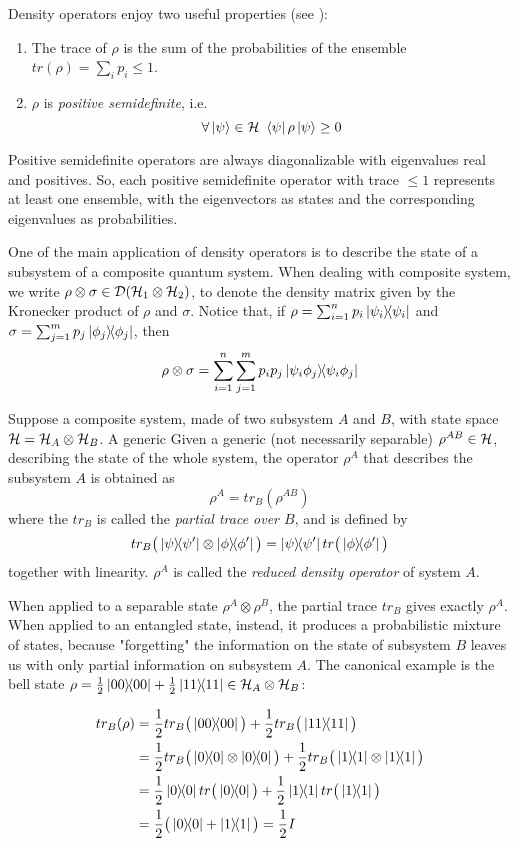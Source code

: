 Density operators enjoy two useful properties (see \cite{nielsenQuantumComputationQuantum2001}): \begin{enumerate}
\item The trace of $\rho$ is the sum of the probabilities of the ensemble $tr(\rho) = \sum_i p_i \leq 1$.
\item $\rho$ is \textit{positive semidefinite}, i.e. 
\[\forall \ket{\psi} \in \mathcal{H} \ \bra{\psi}\rho\ket{\psi} \geq 0\]
\end{enumerate}

Positive semidefinite operators are always diagonalizable with eigenvalues real and positives. So, each positive semidefinite operator with trace $\leq 1$ represents at least one ensemble, with the eigenvectors as states and the corresponding eigenvalues as probabilities.

One of the main application of density operators is to describe the state of a subsystem of a composite quantum system. When dealing with composite system, we write $\rho \otimes \sigma \in \mathcal{D}(\mathcal{H}_1 \otimes \mathcal{H}_2)$, to denote the density matrix given by the Kronecker product of $\rho$ and $\sigma$. Notice that, if $\rho = \sum_{i=1}^n p_i\ket{\psi_i}\!\!\bra{\psi_i}$ and $\sigma = \sum_{j=1}^m p_j\ket{\phi_j}\!\!\bra{\phi_j}$, then 
\[\rho \otimes \sigma = \sum_{i=1}^n\sum_{j=1}^m p_ip_j \ket{\psi_i\phi_j}\!\!\bra{\psi_i\phi_j}\]

Suppose a composite system, made of two subsystem $A$ and $B$, with state space  $\mathcal{H} = \mathcal{H}_A \otimes \mathcal{H}_B$. A generic  Given a generic (not necessarily separable) $\rho^{AB} \in \mathcal{H}$, describing the state of the whole system, the operator $\rho^A$ that describes the subsystem $A$ is obtained as 
\[
	\rho^A = tr_B(\rho^{AB})
\]
where the $tr_B$ is called the \textit{partial trace over $B$}, and is defined by 
\[
 tr_B\big(\ketbra{\psi}{\psi'} \otimes \ketbra{\phi}{\phi'}\big) = \ketbra{\psi}{\psi'}tr\big(\ketbra{\phi}{\phi'}\big)
\]
together with linearity. $\rho^A$ is called the \textit{reduced density operator} of system $A$.

When applied to a separable state $\rho^A \otimes \rho^B$, the partial trace $tr_B$ gives exactly $\rho^A$. When applied to an entangled state, instead, it produces a probabilistic mixture of states, because "forgetting" the information on the state of subsystem $B$ leaves us with only partial information on subsystem $A$. The canonical example is the bell state $\rho = \frac{1}{2} \ket{00}\!\!\bra{00} + \frac{1}{2}\ket{11}\!\!\bra{11} \in \mathcal{H}_A \otimes \mathcal{H}_B$: 

\begin{align*}
tr_B(\rho) &= \frac{1}{2} tr_B\big(\proj{00}\big) + \frac{1}{2}tr_B\big(\proj{11}\big)  \\
	&= \frac{1}{2} tr_B\big(\proj{0}\otimes\proj{0}\big) + \frac{1}{2}tr_B\big(\proj{1}\otimes\proj{1}\big) \\
	&= \frac{1}{2} \proj{0}tr\big(\proj{0}\big) + \frac{1}{2}\proj{1}tr\big(\proj{1}\big) \\
	&= \frac{1}{2} \big(\proj{0} + \proj{1}\big) = \frac{1}{2}I
\end{align*}


